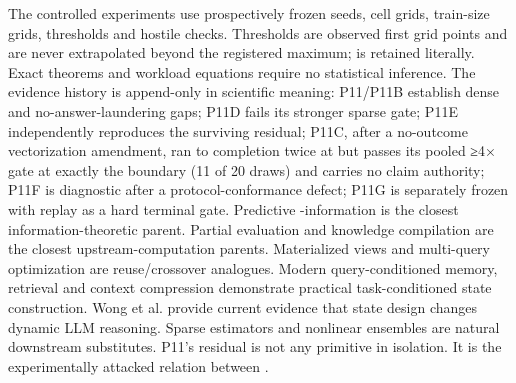 \markdownRendererDocumentBegin
\markdownRendererSectionBegin
{}\markdownRendererInterblockSeparator
{}The controlled experiments use prospectively frozen seeds, cell grids, train-size grids, thresholds and hostile checks. Thresholds are observed first grid points and are never extrapolated beyond the registered maximum;  is retained literally. Exact theorems and workload equations require no statistical inference.\markdownRendererInterblockSeparator
{}The evidence history is append-only in scientific meaning: P11/P11B establish dense and no-answer-laundering gaps; P11D fails its stronger sparse gate; P11E independently reproduces the surviving residual; P11C, after a no-outcome vectorization amendment, ran to completion twice at  but passes its pooled ≥4× gate at exactly the boundary (11 of 20 draws) and carries no claim authority; P11F is diagnostic after a protocol-conformance defect; P11G is separately frozen with replay as a hard terminal gate.\markdownRendererInterblockSeparator
{}Predictive -information is the closest information-theoretic parent. Partial evaluation and knowledge compilation are the closest upstream-computation parents. Materialized views and multi-query optimization are reuse/crossover analogues. Modern query-conditioned memory, retrieval and context compression demonstrate practical task-conditioned state construction. Wong et al. provide current evidence that state design changes dynamic LLM reasoning. Sparse estimators and nonlinear ensembles are natural downstream substitutes.\markdownRendererInterblockSeparator
{}P11's residual is not any primitive in isolation. It is the experimentally attacked relation between .
\markdownRendererSectionEnd \markdownRendererDocumentEnd